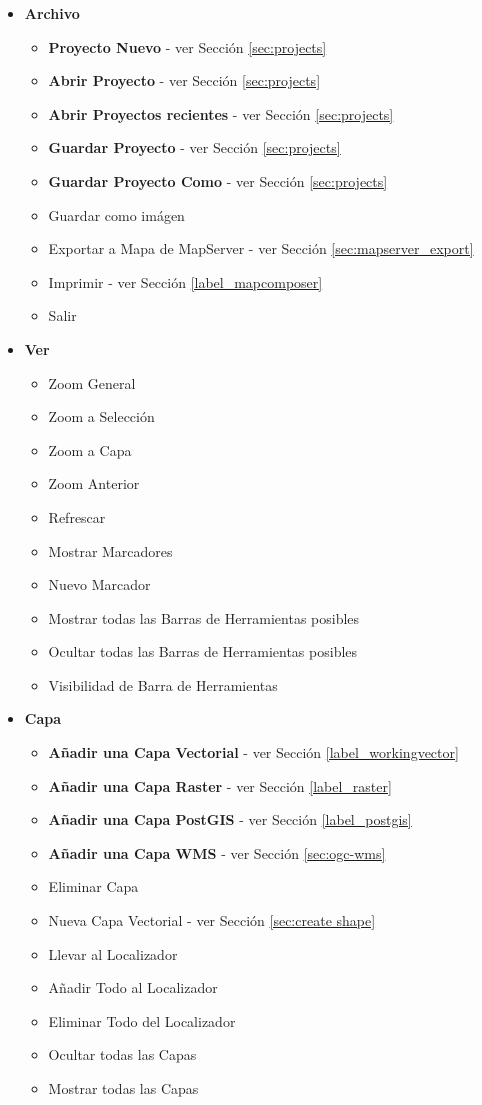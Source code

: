 \begin{itemize}

\item \textbf{Archivo}
\begin{itemize}
\item \textbf{Proyecto Nuevo}          - ver Sección \ref{sec:projects}
\item \textbf{Abrir Proyecto}         - ver Sección \ref{sec:projects}
\item \textbf{Abrir Proyectos recientes} - ver Sección \ref{sec:projects}
\item \textbf{Guardar Proyecto}         - ver Sección \ref{sec:projects}
\item \textbf{Guardar Proyecto Como}      - ver Sección \ref{sec:projects}
\item Guardar como imágen
\item Exportar a Mapa de MapServer       - ver Sección \ref{sec:mapserver_export}
\item Imprimir                         - ver Sección \ref{label_mapcomposer}
\item Salir
\end{itemize}

\item \textbf{Ver}
\begin{itemize}
\item Zoom General
\item Zoom a Selección
\item Zoom a Capa
\item Zoom Anterior
\item Refrescar
\item Mostrar Marcadores
\item Nuevo Marcador
\item Mostrar todas las Barras de Herramientas posibles
\item Ocultar todas las Barras de Herramientas posibles
\item Visibilidad de Barra de Herramientas 
\end{itemize}

\item \textbf{Capa}
\begin{itemize}
\item \textbf{Añadir una Capa Vectorial}       - ver Sección \ref{label_workingvector}
\item \textbf{Añadir una Capa Raster}       - ver Sección \ref{label_raster}
\item \textbf{Añadir una Capa PostGIS}      - ver Sección \ref{label_postgis}
\item \textbf{Añadir una Capa WMS}          - ver Sección \ref{sec:ogc-wms}
\item Eliminar Capa
\item Nueva Capa Vectorial          	- ver Sección \ref{sec:create shape}
\item Llevar al Localizador
\item Añadir Todo al Localizador
\item Eliminar Todo del Localizador
\item Ocultar todas las Capas
\item Mostrar todas las Capas
\end{itemize}


\end{itemize}
